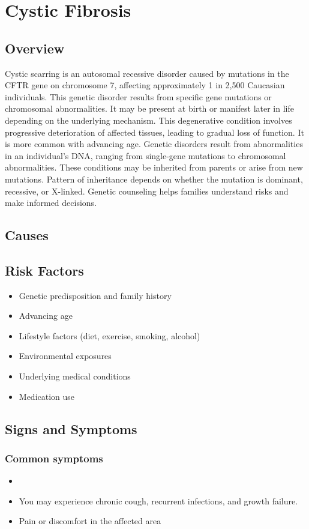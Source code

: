 \chapter{Cystic Fibrosis}
\label{sec:Cystic Fibrosis}

\section{Overview}
Cystic scarring is an autosomal recessive disorder caused by mutations in the CFTR gene on chromosome 7, affecting approximately 1 in 2,500 Caucasian individuals. This genetic disorder results from specific gene mutations or chromosomal abnormalities. It may be present at birth or manifest later in life depending on the underlying mechanism. This degenerative condition involves progressive deterioration of affected tissues, leading to gradual loss of function. It is more common with advancing age. Genetic disorders result from abnormalities in an individual's DNA, ranging from single-gene mutations to chromosomal abnormalities. These conditions may be inherited from parents or arise from new mutations. Pattern of inheritance depends on whether the mutation is dominant, recessive, or X-linked. Genetic counseling helps families understand risks and make informed decisions.
\section{Causes}
\section{Risk Factors}

\begin{itemize}[noitemsep]
  \item Genetic predisposition and family history
  \item Advancing age
  \item Lifestyle factors (diet, exercise, smoking, alcohol)
  \item Environmental exposures
  \item Underlying medical conditions
  \item Medication use
\end{itemize}
\section{Signs and Symptoms}

\subsection{Common symptoms}
\begin{itemize}[noitemsep]
  \item \item You may experience chronic cough, recurrent infections, and growth failure.

  \item Pain or discomfort in the affected area
  \end{itemize}

